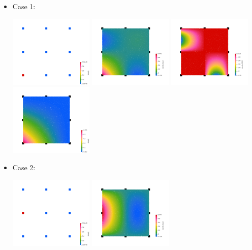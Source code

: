 \begin{itemize}
\item Case 1:
\begin{center}
\includegraphics[width=4cm]{images/bernstein/nodes0000.png}
\includegraphics[width=4cm]{images/bernstein/rhoQ2_0.png}
\includegraphics[width=4cm]{images/bernstein/rhoQ2neg_0.png}
\includegraphics[width=4cm]{images/bernstein/rhoB2_0.png}\\
\end{center}
\item Case 2:
\begin{center}
\includegraphics[width=4cm]{images/bernstein/nodes0001.png}
\includegraphics[width=4cm]{images/bernstein/rhoQ2_1.png}

\end{center}
\end{itemize}
